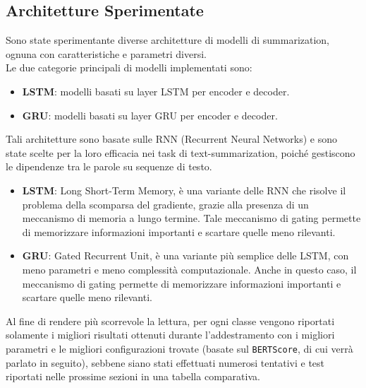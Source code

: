 \subsection{Architetture Sperimentate}
Sono state sperimentante diverse architetture di modelli di summarization, ognuna con caratteristiche e parametri diversi.\\
Le due categorie principali di modelli implementati sono:
\begin{itemize}
    \item \textbf{LSTM}: modelli basati su layer LSTM per encoder e decoder.
    \item \textbf{GRU}: modelli basati su layer GRU per encoder e decoder.
\end{itemize}
Tali architetture sono basate sulle RNN (Recurrent Neural Networks) e sono state scelte per la loro efficacia nei task di text-summarization, poiché
gestiscono le dipendenze tra le parole su sequenze di testo.\\
\begin{itemize}
    \item \textbf{LSTM}: Long Short-Term Memory, è una variante delle RNN che risolve il problema della scomparsa del gradiente, grazie alla presenza di un meccanismo di memoria a lungo termine.
          Tale meccanismo di gating permette di memorizzare informazioni importanti e scartare quelle meno rilevanti.
    \item \textbf{GRU}: Gated Recurrent Unit, è una variante più semplice delle LSTM, con meno parametri e meno complessità computazionale.
          Anche in questo caso, il meccanismo di gating permette di memorizzare informazioni importanti e scartare quelle meno rilevanti.
\end{itemize}

Al fine di rendere più scorrevole la lettura, per ogni classe vengono riportati solamente i migliori risultati ottenuti durante l'addestramento con i migliori parametri e le migliori configurazioni trovate (basate sul \texttt{BERTScore}, di cui verrà parlato in seguito), sebbene
siano stati effettuati numerosi tentativi e test riportati nelle prossime sezioni in una tabella comparativa.\\





%
